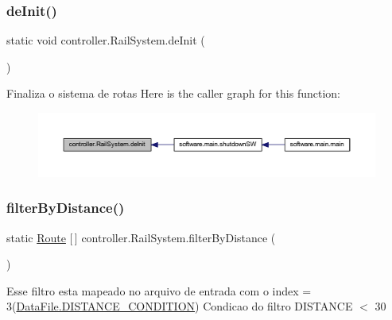 \subsubsection{\texorpdfstring{de\+Init()}{deInit()}}
{\footnotesize\ttfamily static void controller.\+Rail\+System.\+de\+Init (\begin{DoxyParamCaption}{ }\end{DoxyParamCaption})\hspace{0.3cm}{\ttfamily [static]}}

Finaliza o sistema de rotas Here is the caller graph for this function\+:\nopagebreak
\begin{figure}[H]
\begin{center}
\leavevmode
\includegraphics[width=350pt]{classcontroller_1_1_rail_system_a03e61f5c81b49dfc59b0d3b7eefc1067_icgraph}
\end{center}
\end{figure}
\mbox{\label{classcontroller_1_1_rail_system_af0f79e772114a04e35ee1f0a8eae66e4}} 
\subsubsection{\texorpdfstring{filter\+By\+Distance()}{filterByDistance()}}
{\footnotesize\ttfamily static \hyperlink{classdomain_1_1_route}{Route} \mbox{[}$\,$\mbox{]} controller.\+Rail\+System.\+filter\+By\+Distance (\begin{DoxyParamCaption}{ }\end{DoxyParamCaption})\hspace{0.3cm}{\ttfamily [static]}}

Esse filtro esta mapeado no arquivo de entrada com o index = 3(\hyperlink{classutilities_1_1_data_file_a7db48e719d69b2fb08dec6730949acf9}{Data\+File.\+D\+I\+S\+T\+A\+N\+C\+E\+\_\+\+C\+O\+N\+D\+I\+T\+I\+ON}) Condicao do filtro D\+I\+S\+T\+A\+N\+CE $<$ 30

